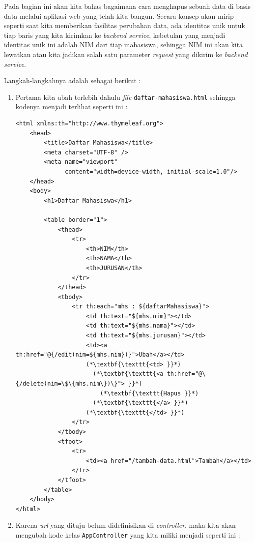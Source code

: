 Pada bagian ini akan kita bahas bagaimana cara menghapus sebuah data di basis data melalui aplikasi web yang telah kita bangun. Secara konsep akan mirip seperti saat kita memberikan fasilitas perubahan data, ada identitas unik untuk tiap baris yang kita kirimkan ke \textit{backend service}, kebetulan yang menjadi identitas unik ini adalah NIM dari tiap mahasiswa, sehingga NIM ini akan kita lewatkan atau kita jadikan salah satu parameter \textit{request} yang dikirim ke \textit{backend service}.

Langkah-langkahnya adalah sebagai berikut :

\begin{enumerate}
	\item Pertama kita ubah terlebih dahulu \textit{file} \texttt{daftar-mahasiswa.html} sehingga kodenya menjadi terlihat seperti ini :
	
	\begin{lstlisting}
<html xmlns:th="http://www.thymeleaf.org">
    <head>
        <title>Daftar Mahasiswa</title>
        <meta charset="UTF-8" />
        <meta name="viewport" 
              content="width=device-width, initial-scale=1.0"/>
    </head>
    <body>
        <h1>Daftar Mahasiswa</h1>
        
        <table border="1">
            <thead>
                <tr>
                    <th>NIM</th>
                    <th>NAMA</th>
                    <th>JURUSAN</th>
                </tr>
            </thead>
            <tbody>
                <tr th:each="mhs : ${daftarMahasiswa}">
                    <td th:text="${mhs.nim}"></td>
                    <td th:text="${mhs.nama}"></td>
                    <td th:text="${mhs.jurusan}"></td>
                    <td><a th:href="@{/edit(nim=${mhs.nim})}">Ubah</a></td>     
                    (*\textbf{\texttt{<td> }}*)
                      (*\textbf{\texttt{<a th:href="@\{/delete(nim=\$\{mhs.nim\})\}"> }}*)
                        (*\textbf{\texttt{Hapus }}*)
                      (*\textbf{\texttt{</a> }}*)
                    (*\textbf{\texttt{</td> }}*)
                </tr>
            </tbody>
            <tfoot>
                <tr>
                    <td><a href="/tambah-data.html">Tambah</a></td>
                </tr>
            </tfoot>
        </table>
    </body>
</html>
	\end{lstlisting}
	
	\item Karena \textit{url} yang dituju belum didefinisikan di \textit{controller}, maka kita akan mengubah kode kelas \texttt{AppController} yang kita miliki menjadi seperti ini :
	

\end{enumerate}
